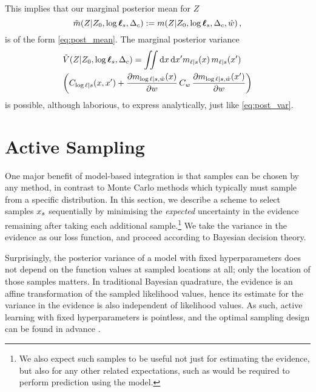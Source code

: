 \documentclass{article}
\begin{document}
This implies that our marginal posterior mean for $Z$ 
\begin{equation}
\tilde{m}(\If|Z_0,\tvr_s,\Delta_c) \deq \mean{\If}{Z_0,\tvr_s,\Delta_c, \hat{w}},
\end{equation}
is of the form \eqref{eq:post_mean}. The marginal posterior variance
\begin{align}
& \tilde{V}(\If|Z_0,\tvr_s,\Delta_c)=
 \iint  \ud \lfv\, \ud\lfv' m_{\lfn|s}(\lfv)\, m_{\lfn|s}(\lfv')\nonumber\\
&  
\biggl(C_{\tr|s}(\lfv,\lfv') + 
\pderiv{m_{\tr|s,\hat{w}}(x)}{w}
\,C_w\,
\pderiv{m_{\tr|s,\hat{w}}(x')}{w}
\biggr)
\end{align}
is possible, although laborious, to express analytically, just like \eqref{eq:post_var}.


\section{Active Sampling}\label{sec:BBQ}

One major benefit of model-based integration is that samples can be chosen by any method, in contrast to Monte Carlo methods which typically must sample from a specific distribution.  In this section, we describe a scheme to select samples $\lfv_s$ sequentially by minimising the \textit{expected} uncertainty in the evidence remaining after taking each additional sample.\footnote{We also expect such samples to be useful not just for estimating the evidence, but also for any other related expectations, such as would be required to perform prediction using the model.} We take the variance in the evidence as our loss function, and proceed according to Bayesian decision theory.

Surprisingly, the posterior variance of a \gpb model with fixed hyperparameters does not depend on the function values at sampled locations at all; only the location of those samples matters. In traditional Bayesian quadrature, the evidence is an affine transformation of the sampled likelihood values, hence its estimate for the variance in the evidence is also independent of likelihood values. As such, active learning with fixed hyperparameters is pointless, and the optimal sampling design can be found in advance \cite{minka2000dqr}.
\end{document}
